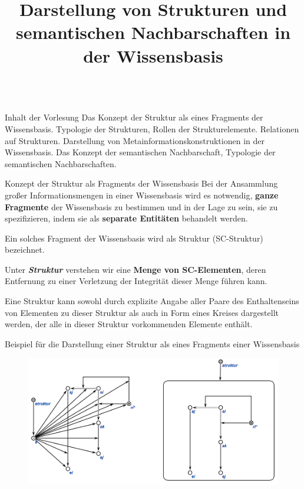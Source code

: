 \title{Darstellung von Strukturen und semantischen Nachbarschaften in der Wissensbasis}   

\begin{frame}
	\titlepage
\end{frame}

\begin{frame}{\\Inhalt der Vorlesung}
	\topline
	\justifying
	Das Konzept der Struktur als eines Fragments der Wissensbasis. Typologie der Strukturen, Rollen der Strukturelemente. Relationen auf Strukturen. Darstellung von Metainformationskonstruktionen in der Wissensbasis. Das Konzept der semantischen Nachbarschaft, Typologie der semantischen Nachbarschaften.
\end{frame}

\begin{frame}{Konzept der Struktur als Fragments der Wissensbasis}
	\topline
	\justifying
	Bei der Ansammlung großer Informationsmengen in einer Wissensbasis wird es notwendig, \textbf{ganze Fragmente} der Wissensbasis zu bestimmen und in der Lage zu sein, sie zu spezifizieren, indem sie als \textbf{separate Entitäten} behandelt werden.
	
	Ein solches Fragment der Wissensbasis wird als Struktur (SC-Struktur) bezeichnet.
	
	Unter \textbf{\textit{Struktur}} verstehen wir eine \textbf{Menge von SC-Elementen}, deren Entfernung zu einer Verletzung der Integrität dieser Menge führen kann.

	Eine Struktur kann sowohl durch explizite Angabe aller Paare des Enthaltenseins von Elementen zu dieser Struktur als auch in Form eines Kreises dargestellt werden, der alle in dieser Struktur vorkommenden Elemente enthält.
\end{frame}

\begin{frame}{Beispiel für die Darstellung einer Struktur als eines Fragments einer Wissensbasis}
	\topline
	\justifying
	\begin{figure}[H]
		\includegraphics[scale=0.5]{./figures/sd_structures/structure_de.png}
	\end{figure}
\end{frame}

